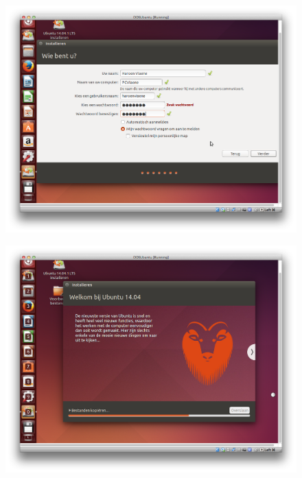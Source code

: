 \documentclass[11pt, a4paper]{article}
\begin{document}
\begin{figure}[H]
	\centering
	\includegraphics[width=\textwidth]{./IMG/Q}
\end{figure}

\begin{figure}[H]
	\centering
	\includegraphics[width=\textwidth]{./IMG/R}
\end{figure}
\end{document}

